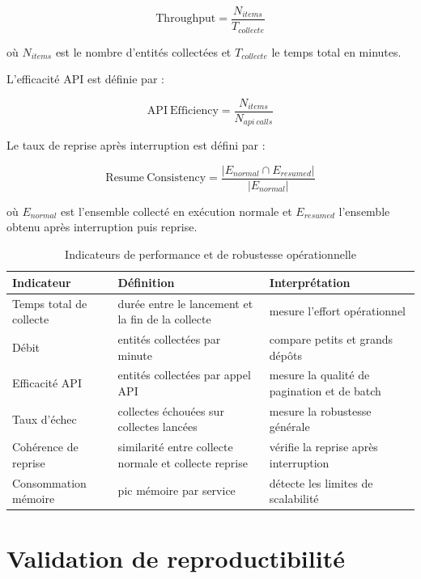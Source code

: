 \begin{equation}
\mathrm{Throughput} = \frac{N_{items}}{T_{collecte}}
\end{equation}

où $N_{items}$ est le nombre d'entités collectées et $T_{collecte}$ le temps total en minutes.

L'efficacité API est définie par :

\begin{equation}
\mathrm{API\ Efficiency} = \frac{N_{items}}{N_{api\ calls}}
\end{equation}

Le taux de reprise après interruption est défini par :

\begin{equation}
\mathrm{Resume\ Consistency} = \frac{|E_{normal} \cap E_{resumed}|}{|E_{normal}|}
\end{equation}

où $E_{normal}$ est l'ensemble collecté en exécution normale et $E_{resumed}$ l'ensemble obtenu après interruption puis reprise.

\begin{table}[H]
\centering
\small
\caption{Indicateurs de performance et de robustesse opérationnelle}
\label{tab:validation-performance}
\begin{tabularx}{\textwidth}{|p{3.4cm}|X|X|}
\hline
\textbf{Indicateur} & \textbf{Définition} & \textbf{Interprétation} \\
\hline
Temps total de collecte & durée entre le lancement et la fin de la collecte & mesure l'effort opérationnel \\
\hline
Débit & entités collectées par minute & compare petits et grands dépôts \\
\hline
Efficacité API & entités collectées par appel API & mesure la qualité de pagination et de batch \\
\hline
Taux d'échec & collectes échouées sur collectes lancées & mesure la robustesse générale \\
\hline
Cohérence de reprise & similarité entre collecte normale et collecte reprise & vérifie la reprise après interruption \\
\hline
Consommation mémoire & pic mémoire par service & détecte les limites de scalabilité \\
\hline
\end{tabularx}
\end{table}

\section{Validation de reproductibilité}
\label{sec:validation-reproductibilite}


